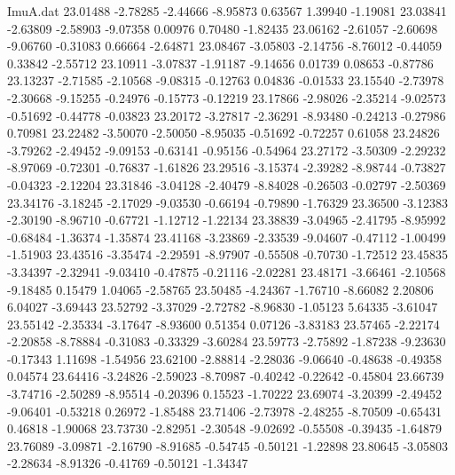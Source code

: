 \begin{filecontents}{ImuA.dat}
  23.01488   -2.78285   -2.44666   -8.95873    0.63567    1.39940   -1.19081
  23.03841   -2.63809   -2.58903   -9.07358    0.00976    0.70480   -1.82435
  23.06162   -2.61057   -2.60698   -9.06760   -0.31083    0.66664   -2.64871
  23.08467   -3.05803   -2.14756   -8.76012   -0.44059    0.33842   -2.55712
  23.10911   -3.07837   -1.91187   -9.14656    0.01739    0.08653   -0.87786
  23.13237   -2.71585   -2.10568   -9.08315   -0.12763    0.04836   -0.01533
  23.15540   -2.73978   -2.30668   -9.15255   -0.24976   -0.15773   -0.12219
  23.17866   -2.98026   -2.35214   -9.02573   -0.51692   -0.44778   -0.03823
  23.20172   -3.27817   -2.36291   -8.93480   -0.24213   -0.27986    0.70981
  23.22482   -3.50070   -2.50050   -8.95035   -0.51692   -0.72257    0.61058
  23.24826   -3.79262   -2.49452   -9.09153   -0.63141   -0.95156   -0.54964
  23.27172   -3.50309   -2.29232   -8.97069   -0.72301   -0.76837   -1.61826
  23.29516   -3.15374   -2.39282   -8.98744   -0.73827   -0.04323   -2.12204
  23.31846   -3.04128   -2.40479   -8.84028   -0.26503   -0.02797   -2.50369
  23.34176   -3.18245   -2.17029   -9.03530   -0.66194   -0.79890   -1.76329
  23.36500   -3.12383   -2.30190   -8.96710   -0.67721   -1.12712   -1.22134
  23.38839   -3.04965   -2.41795   -8.95992   -0.68484   -1.36374   -1.35874
  23.41168   -3.23869   -2.33539   -9.04607   -0.47112   -1.00499   -1.51903
  23.43516   -3.35474   -2.29591   -8.97907   -0.55508   -0.70730   -1.72512
  23.45835   -3.34397   -2.32941   -9.03410   -0.47875   -0.21116   -2.02281
  23.48171   -3.66461   -2.10568   -9.18485    0.15479    1.04065   -2.58765
  23.50485   -4.24367   -1.76710   -8.66082    2.20806    6.04027   -3.69443
  23.52792   -3.37029   -2.72782   -8.96830   -1.05123    5.64335   -3.61047
  23.55142   -2.35334   -3.17647   -8.93600    0.51354    0.07126   -3.83183
  23.57465   -2.22174   -2.20858   -8.78884   -0.31083   -0.33329   -3.60284
  23.59773   -2.75892   -1.87238   -9.23630   -0.17343    1.11698   -1.54956
  23.62100   -2.88814   -2.28036   -9.06640   -0.48638   -0.49358    0.04574
  23.64416   -3.24826   -2.59023   -8.70987   -0.40242   -0.22642   -0.45804
  23.66739   -3.74716   -2.50289   -8.95514   -0.20396    0.15523   -1.70222
  23.69074   -3.20399   -2.49452   -9.06401   -0.53218    0.26972   -1.85488
  23.71406   -2.73978   -2.48255   -8.70509   -0.65431    0.46818   -1.90068
  23.73730   -2.82951   -2.30548   -9.02692   -0.55508   -0.39435   -1.64879
  23.76089   -3.09871   -2.16790   -8.91685   -0.54745   -0.50121   -1.22898
  23.80645   -3.05803   -2.28634   -8.91326   -0.41769   -0.50121   -1.34347

\end{filecontents}
